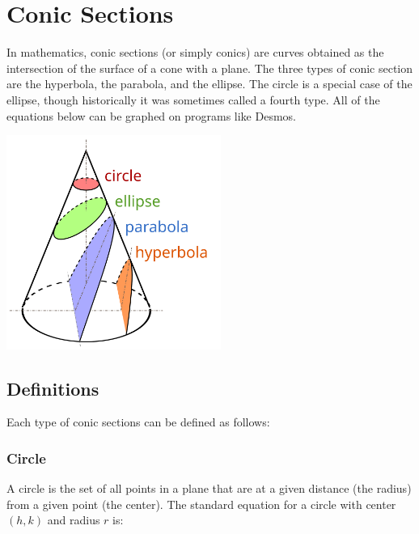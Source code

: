 \chapter{Conic Sections}

In mathematics, conic sections (or simply conics) are curves obtained
as the intersection of the surface of a cone with a plane. The three
types of conic section are the hyperbola, the parabola, and the
ellipse. The circle is a special case of the ellipse, though
historically it was sometimes called a fourth type. All of the equations below can be graphed on programs like Desmos. 

\begin{center}
    
    \includegraphics[width=7cm]{Conic_Sections.png}

\end{center}


\section{Definitions}

Each type of conic sections can be defined as follows:

\subsection{Circle}

A circle is the set of all points in a plane that are at a given
distance (the radius) from a given point (the center). The standard
equation for a circle with center $(h,k)$ and radius $r$ is:

